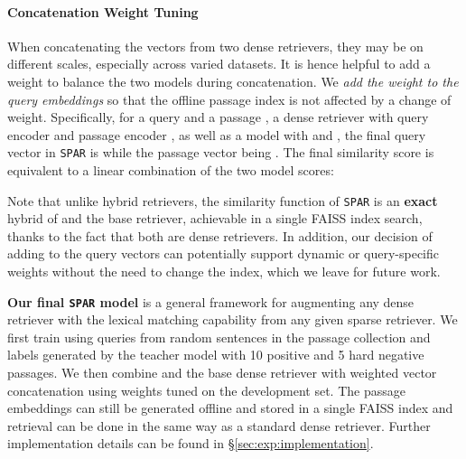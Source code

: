 \documentclass[11pt]{article}
\newcommand{\spar}{\texttt{SPAR}\xspace}
\newcommand{\lexmodelsymbol}{\xspace}
\newcommand{\secref}[1]{\S\ref{#1}}
\begin{document}
\paragraph{Concatenation Weight Tuning}
When concatenating the vectors from two dense retrievers, they may be on different scales, especially across varied datasets.
It is hence helpful to add a weight  to balance the two models during concatenation. 
We \emph{add the weight to the query embeddings} so that the offline passage index is not affected by a change of weight.
Specifically, for a query  and a passage , a dense retriever with query encoder  and passage encoder , as well as a \lexmodelsymbol{} model with  and , the final query vector in \spar{} is  while the passage vector being .
The final similarity score is equivalent to a linear combination of the two model scores:

Note that unlike hybrid retrievers, the similarity function of \spar{} is an \textbf{exact} hybrid of \lexmodelsymbol{} and the base retriever, achievable in a single FAISS index search, thanks to the fact that both are dense retrievers.
In addition, our decision of adding  to the query vectors can potentially support dynamic or query-specific weights without the need to change the index, which we leave for future work.

\noindent\textbf{Our final \spar{} model} is a general framework for augmenting any dense retriever with the lexical matching capability from any given sparse retriever.
We first train \lexmodelsymbol{} using queries from random sentences in the passage collection and labels generated by the teacher model with 10 positive and 5 hard negative passages.
We then combine \lexmodelsymbol{} and the base dense retriever with weighted vector concatenation using weights tuned on the development set.
The passage embeddings can still be generated offline and stored in a single FAISS index and retrieval can be done in the same way as a standard dense retriever.
Further implementation details can be found in \secref{sec:exp:implementation}.
\end{document}
